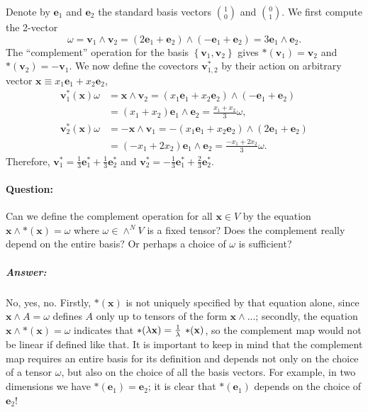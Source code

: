 Denote by $\mathbf{e}_{1}$ and $\mathbf{e}_{2}$ the standard basis
vectors ${1 \choose 0}$ and ${0 \choose 1}$. We first compute the
2-vector \[
\omega=\mathbf{v}_{1}\wedge\mathbf{v}_{2}=\left(2\mathbf{e}_{1}+\mathbf{e}_{2}\right)\wedge\left(-\mathbf{e}_{1}+\mathbf{e}_{2}\right)=3\mathbf{e}_{1}\wedge\mathbf{e}_{2}.\]
 The {}``complement'' operation for the basis $\left\{ \mathbf{v}_{1},\mathbf{v}_{2}\right\} $
gives $*(\mathbf{v}_{1})=\mathbf{v}_{2}$ and $*(\mathbf{v}_{2})=-\mathbf{v}_{1}$.
We now define the covectors $\mathbf{v}_{1,2}^{*}$ by their action
on arbitrary vector $\mathbf{x}\equiv x_{1}\mathbf{e}_{1}+x_{2}\mathbf{e}_{2}$,\begin{align*}
\mathbf{v}_{1}^{*}(\mathbf{x})\omega & =\mathbf{x}\wedge\mathbf{v}_{2}=\left(x_{1}\mathbf{e}_{1}+x_{2}\mathbf{e}_{2}\right)\wedge\left(-\mathbf{e}_{1}+\mathbf{e}_{2}\right)\\
 & =\left(x_{1}+x_{2}\right)\mathbf{e}_{1}\wedge\mathbf{e}_{2}=\frac{x_{1}+x_{2}}{3}\omega,\\
\mathbf{v}_{2}^{*}(\mathbf{x})\omega & =-\mathbf{x}\wedge\mathbf{v}_{1}=-\left(x_{1}\mathbf{e}_{1}+x_{2}\mathbf{e}_{2}\right)\wedge\left(2\mathbf{e}_{1}+\mathbf{e}_{2}\right)\\
 & =\left(-x_{1}+2x_{2}\right)\mathbf{e}_{1}\wedge\mathbf{e}_{2}=\frac{-x_{1}+2x_{2}}{3}\omega.\end{align*}
Therefore, $\mathbf{v}_{1}^{*}=\frac{1}{3}\mathbf{e}_{1}^{*}+\frac{1}{3}\mathbf{e}_{2}^{*}$
and $\mathbf{v}_{2}^{*}=-\frac{1}{3}\mathbf{e}_{1}^{*}+\frac{2}{3}\mathbf{e}_{2}^{*}$.


\paragraph{Question:}

Can we define the complement operation for all $\mathbf{x}\in V$
by the equation $\mathbf{x}\wedge*(\mathbf{x})=\omega$ where $\omega\in\wedge^{N}V$
is a fixed tensor? Does the complement really depend on the entire
basis? Or perhaps a choice of $\omega$ is sufficient?


\subparagraph{Answer: }

No, yes, no. Firstly, $*(\mathbf{x})$ is not uniquely specified by
that equation alone, since $\mathbf{x}\wedge A=\omega$ defines $A$
only up to tensors of the form $\mathbf{x}\wedge...$; secondly, the
equation $\mathbf{x}\wedge*(\mathbf{x})=\omega$ indicates that $*(\lambda\mathbf{x})=\frac{1}{\lambda}\,*\negmedspace(\mathbf{x})$,
so the complement map would not be linear if defined like that. It
is important to keep in mind that the complement map requires an entire
basis for its definition and depends not only on the choice of a tensor
$\omega$, but also on the choice of all the basis vectors. For example,
in two dimensions we have $*(\mathbf{e}_{1})=\mathbf{e}_{2}$; it
is clear that $*(\mathbf{e}_{1})$ depends on the choice of $\mathbf{e}_{2}$!


